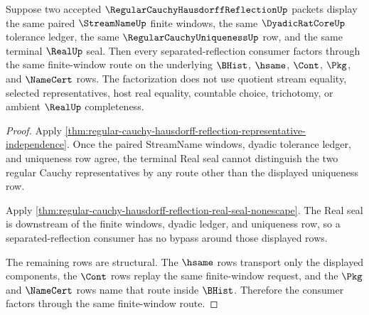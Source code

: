 \begin{theorem}
\label{thm:regular-cauchy-hausdorff-reflection-finite-window-uniqueness-route}
Suppose two accepted $\RegularCauchyHausdorffReflectionUp$ packets display the same paired $\StreamNameUp$ finite windows, the same $\DyadicRatCoreUp$ tolerance ledger, the same $\RegularCauchyUniquenessUp$ row, and the same terminal $\RealUp$ seal. Then every separated-reflection consumer factors through the same finite-window route on the underlying $\BHist$, $\hsame$, $\Cont$, $\Pkg$, and $\NameCert$ rows. The factorization does not use quotient stream equality, selected representatives, host real equality, countable choice, trichotomy, or ambient $\RealUp$ completeness.
\end{theorem}
\begin{proof}
Apply \autoref{thm:regular-cauchy-hausdorff-reflection-representative-independence}. Once the paired StreamName windows, dyadic tolerance ledger, and uniqueness row agree, the terminal Real seal cannot distinguish the two regular Cauchy representatives by any route other than the displayed uniqueness row.

Apply \autoref{thm:regular-cauchy-hausdorff-reflection-real-seal-nonescape}. The Real seal is downstream of the finite windows, dyadic ledger, and uniqueness row, so a separated-reflection consumer has no bypass around those displayed rows.

The remaining rows are structural. The $\hsame$ rows transport only the displayed components, the $\Cont$ rows replay the same finite-window request, and the $\Pkg$ and $\NameCert$ rows name that route inside $\BHist$. Therefore the consumer factors through the same finite-window route.
\end{proof}




